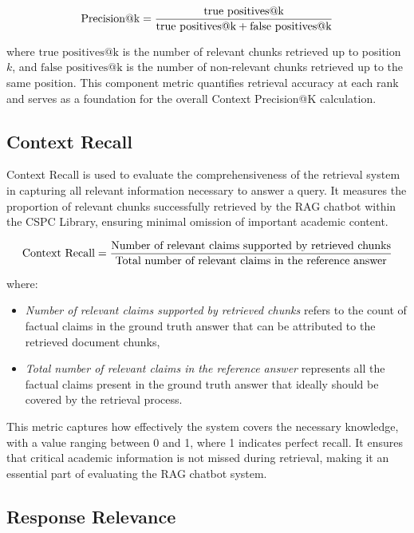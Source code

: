 \begin{refsection}
\begin{equation}
\centering
\text{Precision@k} = 
\frac{
    \text{true positives@k}
}{
    \text{true positives@k} + \text{false positives@k}
}
\end{equation}

where $\text{true positives@k}$ is the number of relevant chunks retrieved up to position $k$, and $\text{false positives@k}$ is the number of non-relevant chunks retrieved up to the same position. This component metric quantifies retrieval accuracy at each rank and serves as a foundation for the overall Context Precision@K calculation.

\newpage
\clearpage
\subsection*{Context Recall}

Context Recall is used to evaluate the comprehensiveness of the retrieval system in capturing all relevant information necessary to answer a query. It measures the proportion of relevant chunks successfully retrieved by the RAG chatbot within the CSPC Library, ensuring minimal omission of important academic content.

\begin{equation}
\centering
\text{Context Recall} = \frac{\text{Number of relevant claims supported by retrieved chunks}}{\text{Total number of relevant claims in the reference answer}}
\end{equation}

where:
\begin{itemize}
    \item \textit{Number of relevant claims supported by retrieved chunks} refers to the count of factual claims in the ground truth answer that can be attributed to the retrieved document chunks,
    \item \textit{Total number of relevant claims in the reference answer} represents all the factual claims present in the ground truth answer that ideally should be covered by the retrieval process.
\end{itemize}

This metric captures how effectively the system covers the necessary knowledge, with a value ranging between 0 and 1, where 1 indicates perfect recall. It ensures that critical academic information is not missed during retrieval, making it an essential part of evaluating the RAG chatbot system.

\newpage
\clearpage
\subsection*{Response Relevance}


\end{refsection}
